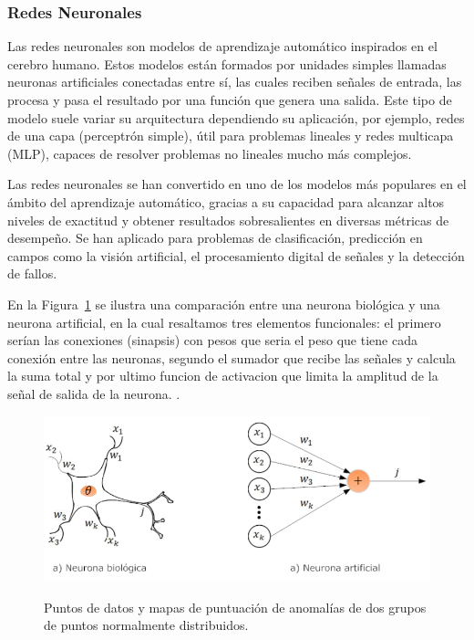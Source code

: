 \documentclass[11pt,a4paper,spanish]{book}
\numberwithin{equation}{chapter}
\numberwithin{figure}{chapter}
\begin{document}
\subsubsection{Redes Neuronales}

Las redes neuronales son modelos de aprendizaje automático inspirados en el cerebro 
humano. Estos modelos están formados por unidades simples llamadas neuronas artificiales 
conectadas entre sí, las cuales reciben señales de entrada, las procesa y pasa el 
resultado por una función que genera una salida. Este tipo de modelo suele variar su 
arquitectura dependiendo su aplicación, por ejemplo, redes de una capa 
(perceptrón simple), útil para problemas lineales y redes multicapa (MLP), capaces de 
resolver problemas no lineales mucho más complejos.


Las redes neuronales se han convertido en uno de los modelos más populares en el ámbito 
del aprendizaje automático, gracias a su capacidad para alcanzar altos niveles de 
exactitud y obtener resultados sobresalientes en diversas métricas de desempeño. 
Se han aplicado para problemas de clasificación, predicción en campos como la visión 
artificial, el procesamiento digital de señales y la detección de fallos. 


En la Figura~\ref{fig:figNauronaArtificial} se ilustra una comparación entre una neurona 
biológica y una neurona artificial, en la cual resaltamos tres elementos funcionales: 
el primero serían las conexiones (sinapsis) con pesos que seria el peso que tiene cada 
conexión entre las neuronas, segundo el sumador que recibe las señales y calcula la suma 
total y por ultimo funcion de activacion que limita la amplitud de la señal de salida de 
la neurona. \cite{fernandez2013redes}.


\begin{figure}[H]
    \caption{Puntos de datos y mapas de puntuación de anomalías de dos grupos de puntos 
    normalmente distribuidos.  \protect\cite{fernandez2013redes} }
    \centering
    \includegraphics[width=1.0\textwidth]{media/neuona-artificial.png}
    \label{fig:figNauronaArtificial}
\end{figure}
\end{document}
